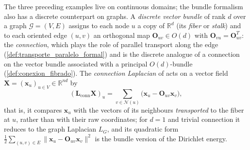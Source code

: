 \begin{example}\label{ex:bundle_neural_networks}
The three preceding examples live on continuous domains; the bundle formalism also has a discrete counterpart on graphs. A \textit{discrete vector bundle} of rank $d$ over a graph $\mathcal{G} = (V, E)$ assigns to each node $u$ a copy of $\mathbb{R}^d$ (its \textit{fiber} or \textit{stalk}) and to each oriented edge $(u,v)$ an orthogonal map $\mathbf{O}_{uv} \in O(d)$ with $\mathbf{O}_{vu} = \mathbf{O}_{uv}^T$: the \textit{connection}, which plays the role of parallel transport along the edge (\autoref{def:transporte_paralelo_formal}) and is the discrete analogue of a connection on the vector bundle associated with a principal $O(d)$-bundle (\autoref{def:conexion_fibrado}). The \textit{connection Laplacian} of \citet{singer2012vector} acts on a vector field $\mathbf{X} = (\mathbf{x}_u)_{u \in V} \in \mathbb{R}^{nd}$ by
\begin{equation}
(\mathbf{L}_{\mathrm{conn}} \mathbf{X})_u = \sum_{v \in \mathcal{N}(u)} \bigl(\mathbf{x}_u - \mathbf{O}_{uv}\mathbf{x}_v\bigr),
\end{equation}
that is, it compares $\mathbf{x}_u$ with the vectors of its neighbours \textit{transported} to the fiber at $u$, rather than with their raw coordinates; for $d = 1$ and trivial connection it reduces to the graph Laplacian $L_G$, and its quadratic form $\frac12\sum_{(u,v) \in E}\|\mathbf{x}_u - \mathbf{O}_{uv}\mathbf{x}_v\|^2$ is the bundle version of the Dirichlet energy.


\end{example}
